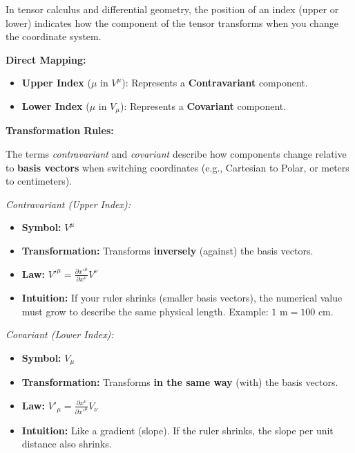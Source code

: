\bigskip 
\begin{foundation}
  In tensor calculus and differential geometry, the position of an index (upper or lower) indicates how the component of the tensor transforms when you change the coordinate system.

  \bigskip\noindent
  \textbf{Direct Mapping:}
  \begin{itemize}
    \item \textbf{Upper Index} ($\mu$ in $V^\mu$): Represents a \textbf{Contravariant} component.
    \item \textbf{Lower Index} ($\mu$ in $V_\mu$): Represents a \textbf{Covariant} component.
  \end{itemize}

  \bigskip\noindent
  \noindent\textbf{Transformation Rules:}

  The terms \emph{contravariant} and \emph{covariant} describe how components change relative to \textbf{basis vectors} when switching coordinates (e.g., Cartesian to Polar, or meters to centimeters).

  \bigskip\noindent
  \noindent\textit{Contravariant (Upper Index):}
  \begin{itemize}
    \item \textbf{Symbol:} $V^\mu$
    \item \textbf{Transformation:} Transforms \textbf{inversely} (against) the basis vectors.
    \medskip
    \item \textbf{Law:} $\displaystyle V'^\mu = \frac{\partial x'^\mu}{\partial x^\nu} V^\nu$
    \medskip
    \item \textbf{Intuition:} If your ruler shrinks (smaller basis vectors), the numerical value must grow to describe the same physical length. Example: $1 \text{ m} = 100 \text{ cm}$.
  \end{itemize}

  \bigskip\noindent
  \noindent\textit{Covariant (Lower Index):}
  \begin{itemize}
    \item \textbf{Symbol:} $V_\mu$
    \item \textbf{Transformation:} Transforms \textbf{in the same way} (with) the basis vectors.
    \medskip
    \item \textbf{Law:} $\displaystyle V'_\mu = \frac{\partial x^\nu}{\partial x'^\mu} V_\nu$
    \medskip
    \item \textbf{Intuition:} Like a gradient (slope). If the ruler shrinks, the slope per unit distance also shrinks.
  \end{itemize}


\end{foundation}
